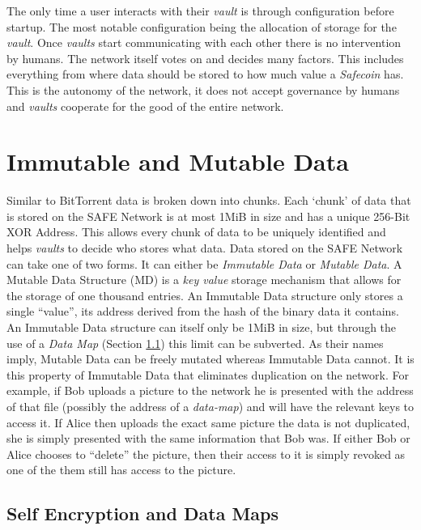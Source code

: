 The only time a user interacts with their \textit{vault} is through configuration before startup. The most notable configuration being the allocation of storage for the \textit{vault}. Once \textit{vaults} start communicating with each other there is no intervention by humans. The network itself votes on and decides many factors. This includes everything from where data should be stored to how much value a \textit{Safecoin} has. This is the autonomy of the network, it does not accept governance by humans and \textit{vaults} cooperate for the good of the entire network.

\section{Immutable and Mutable Data}

Similar to BitTorrent data is broken down into chunks. Each `chunk' of data that is stored on the SAFE Network is at most 1MiB in size and has a unique 256-Bit XOR Address. This allows every chunk of data to be uniquely identified and helps \textit{vaults} to decide who stores what data. Data stored on the SAFE Network can take one of two forms. It can either be \textit{Immutable Data} or \textit{Mutable Data}. A Mutable Data Structure (MD) is a \textit{key value} storage mechanism that allows for the storage of one thousand entries. An Immutable Data structure only stores a single ``value'', its address derived from the hash of the binary data it contains. An Immutable Data structure can itself only be 1MiB in size, but through the use of a \textit{Data Map} (Section \ref{subsec:self-encryption-data-map}) this limit can be subverted. As their names imply, Mutable Data can be freely mutated whereas Immutable Data cannot. It is this property of Immutable Data that eliminates duplication on the network. For example, if Bob uploads a picture to the network he is presented with the address of that file (possibly the address of a \textit{data-map}) and will have the relevant keys to access it. If Alice then uploads the exact same picture the data is not duplicated, she is simply presented with the same information that Bob was. If either Bob or Alice chooses to ``delete'' the picture, then their access to it is simply revoked as one of the them still has access to the picture.

\subsection{Self Encryption and Data Maps}
\label{subsec:self-encryption-data-map}

